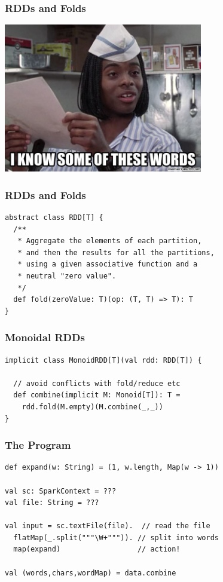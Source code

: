 \documentclass[aspectratio=169]{beamer}
\begin{document}
\begin{frame}[fragile]
  \frametitle{RDDs and Folds}
  \begin{center}
    \includegraphics[width=0.65\textwidth]{static-images/some-words.jpg}
  \end{center}
\end{frame}

\begin{frame}[fragile]
  \frametitle{RDDs and Folds}
\begin{verbatim}
abstract class RDD[T] {
  /**
   * Aggregate the elements of each partition,
   * and then the results for all the partitions,
   * using a given associative function and a
   * neutral "zero value".
   */
  def fold(zeroValue: T)(op: (T, T) => T): T
}
\end{verbatim}
\end{frame}

\begin{frame}[fragile]
  \frametitle{Monoidal RDDs}
\begin{verbatim}
implicit class MonoidRDD[T](val rdd: RDD[T]) {

  // avoid conflicts with fold/reduce etc
  def combine(implicit M: Monoid[T]): T =
    rdd.fold(M.empty)(M.combine(_,_))
}
\end{verbatim}
\end{frame}

\begin{frame}
  \frametitle{The Program}
\begin{verbatim}
def expand(w: String) = (1, w.length, Map(w -> 1))

val sc: SparkContext = ???
val file: String = ???

val input = sc.textFile(file).  // read the file
  flatMap(_.split("""\W+""")). // split into words
  map(expand)                  // action!

val (words,chars,wordMap) = data.combine
\end{verbatim}
\end{frame}
\end{document}
